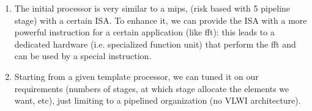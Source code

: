 \begin{enumerate}
  \item The initial processor is very similar to a mips, (risk based with 5
    pipeline stage) with a certain ISA. To enhance it, we can provide the ISA
    with a more powerful instruction for a certain application (like fft): this
    leads to a dedicated hardware (i.e. specialized function unit) that perform
    the fft and can be used by a special instruction.

  \item Starting from a given template processor, we can tuned it on our
    requirements (numbers of stages, at which stage allocate the elements we
    want, etc), just limiting to a pipelined organization (no VLWI
    architecture).
\end{enumerate}


